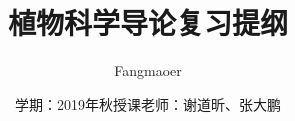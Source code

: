 \documentclass[UTF8, a4paper]{book}
\begin{document}
\title{\textbf{植物科学导论复习提纲}}
\author{Fangmaoer}
\date{学期：2019年秋\qquad 授课老师：谢道昕、张大鹏}
\maketitle
\tableofcontents{}


\mainmatter
\hypersetup{pageanchor=true}












\end{document}
